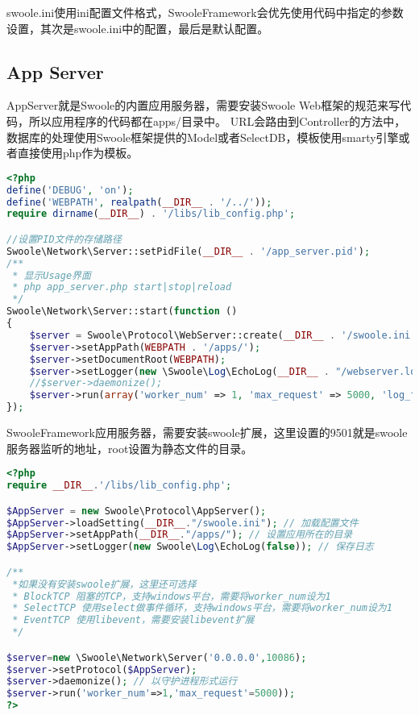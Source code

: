 swoole.ini使用ini配置文件格式，SwooleFramework会优先使用代码中指定的参数设置，其次是swoole.ini中的配置，最后是默认配置。

\subsection{App Server}


AppServer就是Swoole的内置应用服务器，需要安装Swoole Web框架的规范来写代码，所以应用程序的代码都在apps/目录中。 URL会路由到Controller的方法中，数据库的处理使用Swoole框架提供的Model或者SelectDB，模板使用smarty引擎或者直接使用php作为模板。

\begin{lstlisting}[language=PHP]
<?php
define('DEBUG', 'on');
define('WEBPATH', realpath(__DIR__ . '/../'));
require dirname(__DIR__) . '/libs/lib_config.php';

//设置PID文件的存储路径
Swoole\Network\Server::setPidFile(__DIR__ . '/app_server.pid');
/**
 * 显示Usage界面
 * php app_server.php start|stop|reload
 */
Swoole\Network\Server::start(function ()
{
    $server = Swoole\Protocol\WebServer::create(__DIR__ . '/swoole.ini');
    $server->setAppPath(WEBPATH . '/apps/');                                 //设置应用所在的目录
    $server->setDocumentRoot(WEBPATH);
    $server->setLogger(new \Swoole\Log\EchoLog(__DIR__ . "/webserver.log")); //Logger
    //$server->daemonize();                                                  //作为守护进程
    $server->run(array('worker_num' => 1, 'max_request' => 5000, 'log_file' => '/tmp/swoole.log'));
});
\end{lstlisting}


SwooleFramework应用服务器，需要安装swoole扩展，这里设置的9501就是swoole服务器监听的地址，root设置为静态文件的目录。

\begin{lstlisting}[language=PHP]
<?php
require __DIR__.'/libs/lib_config.php';

$AppServer = new Swoole\Protocol\AppServer();
$AppServer->loadSetting(__DIR__."/swoole.ini"); // 加载配置文件
$AppServer->setAppPath(__DIR__."/apps/"); // 设置应用所在的目录
$AppServer->setLogger(new Swoole\Log\EchoLog(false)); // 保存日志

/**
 *如果没有安装swoole扩展，这里还可选择
 * BlockTCP 阻塞的TCP，支持windows平台，需要将worker_num设为1
 * SelectTCP 使用select做事件循环，支持windows平台，需要将worker_num设为1
 * EventTCP 使用libevent，需要安装libevent扩展
 */

$server=new \Swoole\Network\Server('0.0.0.0',10086);
$server->setProtocol($AppServer);
$server->daemonize(); // 以守护进程形式运行
$server->run('worker_num'=>1,'max_request'=5000));
?>
\end{lstlisting}



